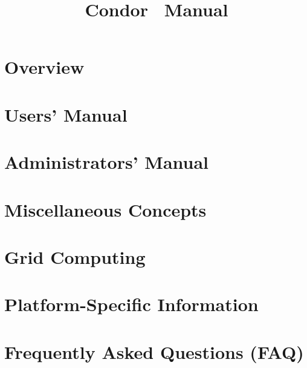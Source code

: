 \documentclass[titlepage,oneside]{book}
\begin{document}
\title{Condor\textsuperscript{\small{\textregistered}} \VersionNotice\ Manual}
\author{\AuthorNotice}
\maketitle


\tableofcontents

\sloppy
\begin{small}

\end{small}

\newpage
{}

\chapter{Overview}
\label{overview}


\chapter{Users' Manual}
\label{user-manual}


\chapter{Administrators' Manual}
\label{admin-manual}


\chapter{Miscellaneous Concepts}




\chapter{Grid Computing}
\label{grid-computing}


\chapter{Platform-Specific Information}
\label{platforms}


\chapter{Frequently Asked Questions (FAQ)}
\label{sec:FAQ}

\end{document}

